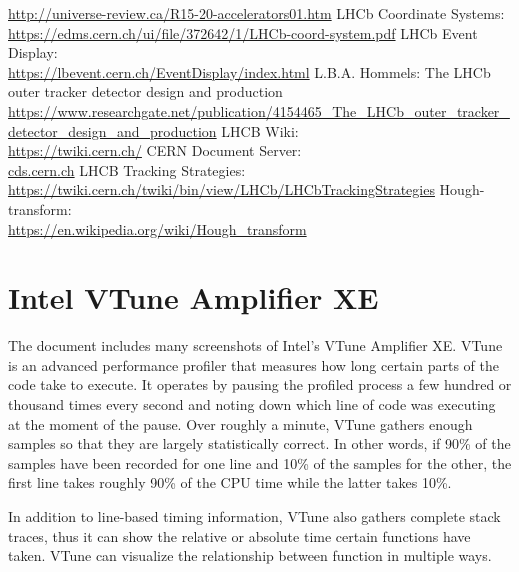\documentclass[12pt]{article}
\begin{document}
\begin{thebibliography}{asd}
		\url{http://universe-review.ca/R15-20-accelerators01.htm}
	 LHCb Coordinate Systems:\\
		\url{https://edms.cern.ch/ui/file/372642/1/LHCb-coord-system.pdf}
	 LHCb Event Display:\\
		\url{https://lbevent.cern.ch/EventDisplay/index.html}
	 L.B.A. Hommels: The LHCb outer tracker detector design and production\\
		\url{https://www.researchgate.net/publication/4154465_The_LHCb_outer_tracker_detector_design_and_production}
	 LHCB Wiki:\\
		\url{https://twiki.cern.ch/}
	 CERN Document Server:\\
		\url{cds.cern.ch}
	 LHCB Tracking Strategies:\\
		\url{https://twiki.cern.ch/twiki/bin/view/LHCb/LHCbTrackingStrategies}
	 Hough-transform:\\
		\url{https://en.wikipedia.org/wiki/Hough_transform}
\end{thebibliography}



\appendix

\newpage

\section{Intel VTune Amplifier XE}

The document includes many screenshots of Intel's VTune Amplifier XE. VTune is an advanced performance profiler that measures how long certain parts of the code take to execute. It operates by pausing the profiled process a few hundred or thousand times every second and noting down which line of code was executing at the moment of the pause. Over roughly a minute, VTune gathers enough samples so that they are largely statistically correct. In other words, if 90\% of the samples have been recorded for one line and 10\% of the samples for the other, the first line takes roughly 90\% of the CPU time while the latter takes 10\%.
\vspace{1pc}

In addition to line-based timing information, VTune also gathers complete stack traces, thus it can show the relative or absolute time certain functions have taken. VTune can visualize the relationship between function in multiple ways.
\vspace{1pc}
\end{document}
